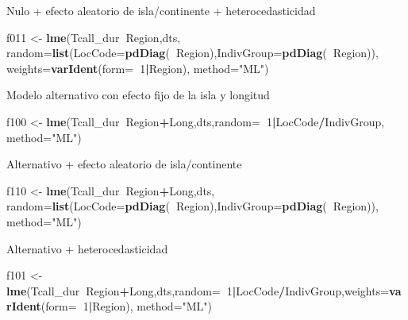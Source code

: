 \documentclass[]{article}
\newenvironment{Shaded}{\begin{snugshade}}{\end{snugshade}}
\newcommand{\DataTypeTok}[1]{\textcolor[rgb]{0.13,0.29,0.53}{#1}}
\newcommand{\DecValTok}[1]{\textcolor[rgb]{0.00,0.00,0.81}{#1}}
\newcommand{\KeywordTok}[1]{\textcolor[rgb]{0.13,0.29,0.53}{\textbf{#1}}}
\newcommand{\NormalTok}[1]{#1}
\newcommand{\OperatorTok}[1]{\textcolor[rgb]{0.81,0.36,0.00}{\textbf{#1}}}
\newcommand{\StringTok}[1]{\textcolor[rgb]{0.31,0.60,0.02}{#1}}
\begin{document}
Nulo + efecto aleatorio de isla/continente + heterocedasticidad

\begin{Shaded}
\begin{Highlighting}[]
\NormalTok{f011 <-}
\StringTok{ }\KeywordTok{lme}\NormalTok{(Tcall_dur}\OperatorTok{~}\NormalTok{Region,dts,}
   \DataTypeTok{random=}\KeywordTok{list}\NormalTok{(}\DataTypeTok{LocCode=}\KeywordTok{pdDiag}\NormalTok{(}\OperatorTok{~}\NormalTok{Region),}\DataTypeTok{IndivGroup=}\KeywordTok{pdDiag}\NormalTok{(}\OperatorTok{~}\NormalTok{Region)),}
   \DataTypeTok{weights=}\KeywordTok{varIdent}\NormalTok{(}\DataTypeTok{form=}\OperatorTok{~}\DecValTok{1}\OperatorTok{|}\NormalTok{Region), }\DataTypeTok{method=}\StringTok{"ML"}\NormalTok{)}
\end{Highlighting}
\end{Shaded}

Modelo alternativo con efecto fijo de la isla y longitud

\begin{Shaded}
\begin{Highlighting}[]
\NormalTok{f100 <-}\StringTok{ }\KeywordTok{lme}\NormalTok{(Tcall_dur}\OperatorTok{~}\NormalTok{Region}\OperatorTok{+}\NormalTok{Long,dts,}\DataTypeTok{random=}\OperatorTok{~}\DecValTok{1}\OperatorTok{|}\NormalTok{LocCode}\OperatorTok{/}\NormalTok{IndivGroup, }\DataTypeTok{method=}\StringTok{"ML"}\NormalTok{)}
\end{Highlighting}
\end{Shaded}

Alternativo + efecto aleatorio de isla/continente

\begin{Shaded}
\begin{Highlighting}[]
\NormalTok{f110 <-}\StringTok{ }\KeywordTok{lme}\NormalTok{(Tcall_dur}\OperatorTok{~}\NormalTok{Region}\OperatorTok{+}\NormalTok{Long,dts,}
     \DataTypeTok{random=}\KeywordTok{list}\NormalTok{(}\DataTypeTok{LocCode=}\KeywordTok{pdDiag}\NormalTok{(}\OperatorTok{~}\NormalTok{Region),}\DataTypeTok{IndivGroup=}\KeywordTok{pdDiag}\NormalTok{(}\OperatorTok{~}\NormalTok{Region)), }\DataTypeTok{method=}\StringTok{"ML"}\NormalTok{)}
\end{Highlighting}
\end{Shaded}

Alternativo + heterocedasticidad

\begin{Shaded}
\begin{Highlighting}[]
\NormalTok{f101 <-}\StringTok{ }\KeywordTok{lme}\NormalTok{(Tcall_dur}\OperatorTok{~}\NormalTok{Region}\OperatorTok{+}\NormalTok{Long,dts,}\DataTypeTok{random=}\OperatorTok{~}\DecValTok{1}\OperatorTok{|}\NormalTok{LocCode}\OperatorTok{/}\NormalTok{IndivGroup,}\DataTypeTok{weights=}\KeywordTok{varIdent}\NormalTok{(}\DataTypeTok{form=}\OperatorTok{~}\DecValTok{1}\OperatorTok{|}\NormalTok{Region), }\DataTypeTok{method=}\StringTok{"ML"}\NormalTok{)}
\end{Highlighting}
\end{Shaded}
\end{document}
